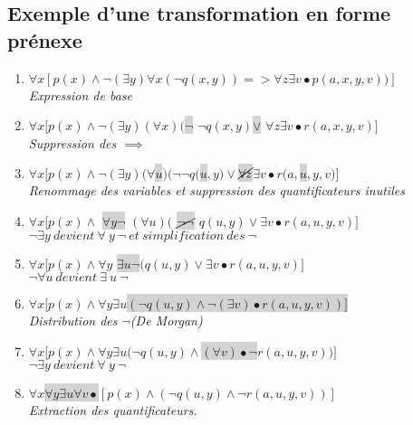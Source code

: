 {\subsection{Exemple d'une transformation en forme prénexe}
\begin{enumerate}
\item $\forall x  [p(x) \land \neg (\exists y) \forall x ( \neg q(x,y)) = > \forall z \exists v \bullet p(a,x,y,v))]$\\ \textit{Expression de base}
\item $\forall x [p(x) \land \neg(\exists y) (\forall x) ($\colorbox{lightgray}{$\neg$} $\neg q(x,y) $\colorbox{lightgray}{$\lor$} $\forall z \exists v \bullet r(a,x,y,v)]$\\\textit{Suppression des $\implies{}$} 
\item $\forall x [p(x) \land \neg(\exists y) (\forall $\colorbox{lightgray}{$u$}$)(\neg\neg q($\colorbox{lightgray}{$u$}$,y) \lor $\colorbox{lightgray}{$\cancel{\forall z}$}$\exists v \bullet r(a,$\colorbox{lightgray}{$u$}$,y,v)]$\\\textit{Renommage des variables et suppression des quantificateurs inutiles}
\item $\forall x [p(x) \land$ \colorbox{lightgray}{$\forall y \neg$} $ (\forall u)($ \colorbox{lightgray}{$\cancel{\neg \neg}$} $q(u,y) \lor \exists v \bullet r(a,u,y,v)] $\\$\neg\exists y\ devient\  \forall \ y\ \neg \ et\ simplification\ des\ \neg$
\item $\forall x [p(x) \land \forall y $ \colorbox{lightgray}{$\exists u \neg$}$(q(u,y) \lor \exists v \bullet r(a,u,y,v)] $\\$\neg\forall u\ devient\  \exists \ u\ \neg$
\item $\forall x [p(x) \land \forall y \exists u $\colorbox{lightgray}{$(\neg q(u,y) \land \neg (\exists v) \bullet r(a,u,y,v))]$}\\ \textit{Distribution des $\neg$}\textit{(De Morgan)}
\item $\forall x [p(x) \land \forall y \exists u (\neg q(u,y) \land $\colorbox{lightgray}{$(\forall v) \bullet \neg$}$ r(a,u,y,v))]$\\$\neg\exists y\ devient\  \forall \ y\ \neg$
\item $\forall x$\colorbox{lightgray}{$ \forall y \exists u \forall v  \bullet$}$ [p(x) \land (\neg q(u,y) \land  \neg r(a,u,y,v))]$\\\textit{Extraction des quantificateurs.}
\end{enumerate}

}
